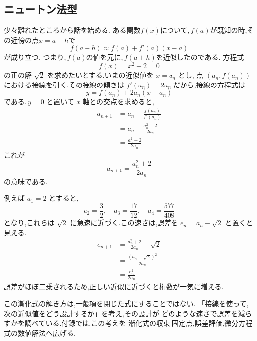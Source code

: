 \subsection{ニュートン法型}

少々離れたところから話を始める.
ある関数$f(x)$について,\,$f(a)$が既知の時,その近傍の点$x=a+h$で
\[
  f(a+h) \approx f(a)+f'(a)(x-a)
\]
が成り立つ.
つまり,\,$f(a)$の値を元に,\,$f(a+h)$を近似したのである.
方程式
\[
  f(x)=x^2-2=0
\]
の正の解 $\sqrt{2}$ を求めたいとする.いまの近似値を $x=a_n$ とし,
点 $(a_n,f(a_n))$ における接線を引く.その接線の傾きは
$f'(a_n)=2a_n$ だから,接線の方程式は
\[
  y=f(a_n)+2a_n(x-a_n)
\]
である.\,$y=0$ と置いて $x$ 軸との交点を求めると,
\begin{align*}
  a_{n+1}
    &=a_n-\frac{f(a_n)}{f'(a_n)}\\
    &=a_n-\frac{a_n^2-2}{2a_n}\\
    &=\frac{a_n^2+2}{2a_n}
\end{align*}
これが
\[
  a_{n+1}=\frac{a_n^2+2}{2a_n}
\]
の意味である.

例えば $a_1=2$ とすると,
\[
  a_2=\frac{3}{2},
  \quad
  a_3=\frac{17}{12},
  \quad
  a_4=\frac{577}{408}
\]
となり,これらは $\sqrt{2}$ に急速に近づく.この速さは,誤差を
$e_n=a_n-\sqrt{2}$ と置くと見える.
\begin{align*}
  e_{n+1}
    &=\frac{a_n^2+2}{2a_n}-\sqrt{2}\\
    &=\frac{(a_n-\sqrt{2})^2}{2a_n}\\
    &=\frac{e_n^2}{2a_n}
\end{align*}
誤差がほぼ二乗されるため,正しい近似に近づくと桁数が一気に増える.

この漸化式の解き方は,一般項を閉じた式にすることではない.
「接線を使って,次の近似値をどう設計するか」を考え,その設計が
どのような速さで誤差を減らすかを調べている.付録では,この考えを
漸化式の収束,固定点,誤差評価,微分方程式の数値解法へ広げる.
